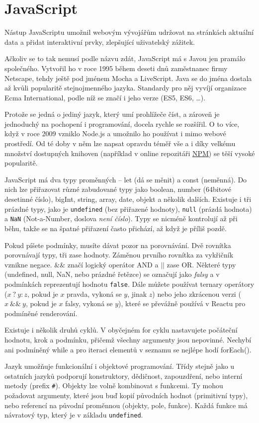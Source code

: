 \section{JavaScript}

Nástup JavaScriptu umožnil webovým vývojářům udržovat na stránkách aktuální data a přidat interaktivní prvky, zlepšující uživatelský zážitek. 

Ačkoliv se to tak nemusí podle názvu zdát, JavaScript má s Javou jen pramálo společného. Vytvořil ho v roce 1995 během deseti dnů zaměstnanec firmy Netscape, tehdy ještě pod jménem Mocha a LiveScript. Java se do jména dostala až kvůli popularitě stejnojmenného jazyka. Standardy pro něj vyvíjí organizace Ecma International, podle níž se značí i jeho verze (ES5, ES6, \ldots).\cite{JSIntroduction}\cite{JSOrigins}\cite{JSHistory}

Protože se jedná o jediný jazyk, který umí prohlížeče číst, a zároveň je jednoduchý na pochopení i programování, docela rychle se rozšířil. O to více, když v roce 2009 vzniklo Node.js a umožnilo ho používat i mimo webové prostředí. Od té doby v něm lze napsat opravdu téměř vše a i díky velkému množství dostupných knihoven (například v online repozitáři \href{https://www.npmjs.com/}{NPM}) se těší vysoké popularitě.

JavaScript má dva typy proměnných – let (dá se měnit) a const (neměnná). Do nich lze přiřazovat různé zabudované typy jako boolean, number (64bitové desetinné číslo), bigInt, string, array, date, objekt a několik dalších. Existuje i tři prázdné typy, jako je \texttt{undefined} (bez přiřazené hodnoty), \texttt{null} (prázdá hodnota) a \texttt{NaN} (Not-a-Number, doslova \textit{není číslo}). Typy se nicméně kontrolují až při běhu, takže se na špatné přiřazení často přichází, až když je příliš pozdě.\cite{JSBasics}\cite{JSTypes}

Pokud píšete podmínky, musíte dávat pozor na porovnávání. Dvě rovnítka porovnávají typy, tři zase hodnoty. Záměnou prvního rovnítka za vykřičník vznikne negace. $\&\&$ značí logický operátor AND a $||$ zase OR. Některé typy (undefined, null, NaN, nebo prázdné řetězce) se označují jako \textit{falsy} a v podmínkách reprezentují hodnotu \texttt{false}. Dále můžete používat ternary operátory ($x\ ?\ y : z$, pokud je $x$ pravda, vykoná se $y$, jinak $z$) nebo jeho zkrácenou verzi ($x\ \&\&\ y$, pokud je $x$ falsy, vykoná se $y$), které se převážně používá v Reactu pro podmíněné renderování.

Existuje i několik druhů cyklů. V obyčejném for cyklu nastavujete počáteční hodnotu, krok a podmínku, přičemž všechny argumenty jsou nepovinné. Nechybí ani podmíněný while a pro iteraci elementů v seznamu se nejlépe hodí forEach().

Jazyk umožňuje funkcionální i objektové programování. Třídy stejně jako u ostatních jazyků podporují konstruktory, dědičnost, zapouzdření, nebo interní metody (prefix \texttt{\#}). Objekty lze volně kombinovat s funkcemi. Ty mohou požadovat argumenty, které jsou buď kopií původních hodnot (primitivní typy), nebo referencí na původní proměnnou (objekty, pole, funkce). Každá funkce má návratový typ, který je v základu \texttt{undefined}.\cite{JSFunctions}\cite{JSFunctionalProgramming}
